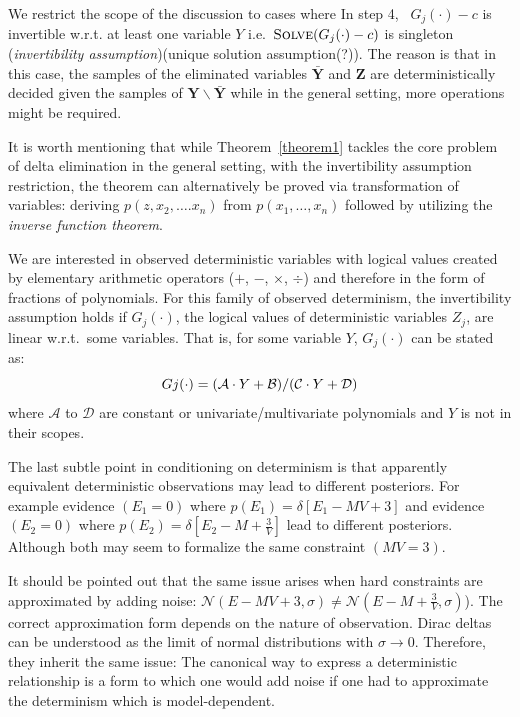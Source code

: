 \documentclass{article}
\newcommand{\bvec}[1]{\textbf{#1}}
\newcommand{\pr}{p}
\begin{document}
We restrict the scope of the discussion to cases where  
In step 4, \ $G_j(\cdot) - c$ is invertible w.r.t. at least one variable $Y$ 
i.e.\ $\textsc{Solve}(G_j(\cdot)-c)$ is singleton (\emph{invertibility assumption}){\color{red}(unique solution assumption(?))}.
The reason is that in this case, 
 the samples of the eliminated variables $\bar{\bvec{Y}}$ and $\bvec{Z}$ 
are deterministically decided given the samples of $\bvec{Y}\backslash \bar{\bvec{Y}}$ while in the general setting, more operations might be required.
%

It is worth mentioning that while Theorem~\ref{theorem1} tackles the core problem of delta elimination in the general setting,
with the invertibility assumption restriction, the theorem can alternatively be proved via transformation of variables: 
deriving $\pr(z, x_2, \ldots. x_n)$ from $\pr(x_1, \ldots, x_n)$ followed by utilizing the \emph{inverse function theorem}.  

We are interested in observed deterministic variables with logical values  
created by elementary arithmetic operators ($+$, $-$, $\times$, $\div$) and therefore 
in the form of fractions of polynomials.
For this family of observed determinism, the invertibility assumption holds
if $G_j(\cdot)$, the logical values of deterministic variables $Z_j$, are linear w.r.t.\ some variables. 
That is, for some variable $Y$, $G_j(\cdot)$ can be stated as: 
\begin{equation}\footnotesize
\label{eq:evidence-form}
Gj(\cdot) = 
{(\mathcal{A} \cdot Y + \mathcal{B})}/{(\mathcal{C} \cdot Y + \mathcal{D})}
\end{equation}
where $\mathcal{A}$ to $\mathcal{D}$ are constant or univariate/multivariate polynomials and $Y$ is not in their scopes.





The last subtle point in conditioning on determinism is that apparently equivalent deterministic observations may lead to different posteriors. For example evidence $(E_1 = 0)$ where $\pr(E_1)= \delta[E_1 - M V + 3]$ and 
evidence $(E_2 = 0)$ where $\pr(E_2) = \delta[E_2 - M + \frac{3}{V}]$ lead to different posteriors. 
Although both may seem to formalize the same constraint $(MV = 3)$.

It should be pointed out that the same issue arises when hard constraints are approximated by adding noise:
$\mathcal{N}(E - MV + 3, \sigma) \neq \mathcal{N}(E -M + \frac{3}{V}, \sigma)$).
The correct approximation form depends on the nature of observation.
Dirac deltas can be understood as the limit of normal distributions with $\sigma \rightarrow 0$.
Therefore, they inherit the same issue: 
The canonical way to express a deterministic relationship is a form to which one would add noise if one had to approximate the determinism which is model-dependent. 
  
\end{document}
